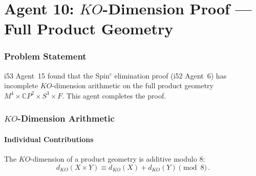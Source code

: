 \documentclass[11pt,a4paper]{article}
\newcommand{\CP}{\mathbb{C}P}
\begin{document}
\part{Agent 10: $KO$-Dimension Proof --- Full Product Geometry}
\label{part:ko-proof}

\section{Problem Statement}

i53 Agent~15 found that the Spin$^c$ elimination proof (i52 Agent~6) has incomplete $KO$-dimension arithmetic on the full product geometry $M^4 \times \CP^2 \times S^3 \times F$. This agent completes the proof.

\section{$KO$-Dimension Arithmetic}

\subsection{Individual Contributions}

The $KO$-dimension of a product geometry is additive modulo 8:
\begin{equation}
d_{KO}(X \times Y) \equiv d_{KO}(X) + d_{KO}(Y) \pmod{8}\,.
\end{equation}
\end{document}
